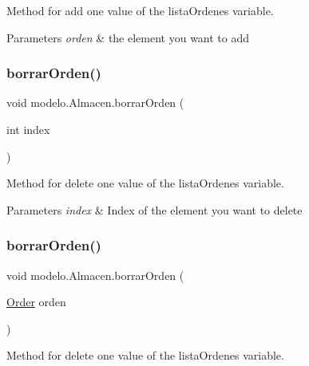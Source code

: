 Method for add one value of the lista\+Ordenes variable. 


\begin{DoxyParams}{Parameters}
{\em orden} & the element you want to add \\
\hline
\end{DoxyParams}
\mbox{\label{classmodelo_1_1_almacen_a9703cc134fcb9dc29e9aeb777bd0ee23}} 
\subsubsection{\texorpdfstring{borrar\+Orden()}{borrarOrden()}\hspace{0.1cm}{\footnotesize\ttfamily [1/2]}}
{\footnotesize\ttfamily void modelo.\+Almacen.\+borrar\+Orden (\begin{DoxyParamCaption}\item[{int}]{index }\end{DoxyParamCaption})}



Method for delete one value of the lista\+Ordenes variable. 


\begin{DoxyParams}{Parameters}
{\em index} & Index of the element you want to delete \\
\hline
\end{DoxyParams}
\mbox{\label{classmodelo_1_1_almacen_ac49185c9cee3416232e739b431cfc6fc}} 
\subsubsection{\texorpdfstring{borrar\+Orden()}{borrarOrden()}\hspace{0.1cm}{\footnotesize\ttfamily [2/2]}}
{\footnotesize\ttfamily void modelo.\+Almacen.\+borrar\+Orden (\begin{DoxyParamCaption}\item[{\mbox{\hyperlink{classmodelo_1_1_order}{Order}}}]{orden }\end{DoxyParamCaption})}



Method for delete one value of the lista\+Ordenes variable. 


